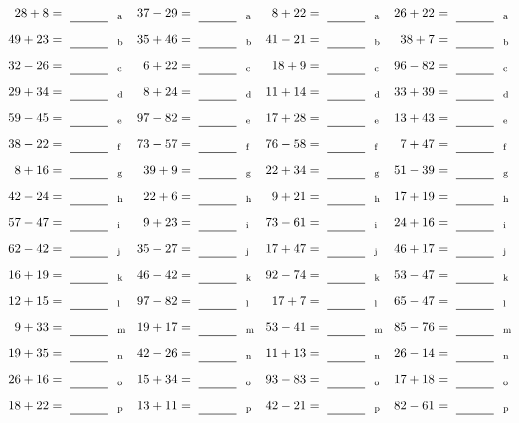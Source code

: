 \documentclass
[
  draft    = true,
  fontsize = 11pt,
  parskip  = half-
]
{scrartcl}
\begin{document}
\clearpage
\begin{align*}
    \pline{28+8}&=\rline{a}
  & \pline{37-29}&=\rline{a}
  & \pline{8+22}&=\rline{a}
  & \pline{26+22}&=\rline{a} \\[1ex]
    \pline{49+23}&=\rline{b}
  & \pline{35+46}&=\rline{b}
  & \pline{41-21}&=\rline{b}
  & \pline{38+7}&=\rline{b} \\[1ex]
    \pline{32-26}&=\rline{c}
  & \pline{6+22}&=\rline{c}
  & \pline{18+9}&=\rline{c}
  & \pline{96-82}&=\rline{c} \\[1ex]
    \pline{29+34}&=\rline{d}
  & \pline{8+24}&=\rline{d}
  & \pline{11+14}&=\rline{d}
  & \pline{33+39}&=\rline{d} \\[1ex]
    \pline{59-45}&=\rline{e}
  & \pline{97-82}&=\rline{e}
  & \pline{17+28}&=\rline{e}
  & \pline{13+43}&=\rline{e} \\[1ex]
    \pline{38-22}&=\rline{f}
  & \pline{73-57}&=\rline{f}
  & \pline{76-58}&=\rline{f}
  & \pline{7+47}&=\rline{f} \\[1ex]
    \pline{8+16}&=\rline{g}
  & \pline{39+9}&=\rline{g}
  & \pline{22+34}&=\rline{g}
  & \pline{51-39}&=\rline{g} \\[1ex]
    \pline{42-24}&=\rline{h}
  & \pline{22+6}&=\rline{h}
  & \pline{9+21}&=\rline{h}
  & \pline{17+19}&=\rline{h} \\[1ex]
    \pline{57-47}&=\rline{i}
  & \pline{9+23}&=\rline{i}
  & \pline{73-61}&=\rline{i}
  & \pline{24+16}&=\rline{i} \\[1ex]
    \pline{62-42}&=\rline{j}
  & \pline{35-27}&=\rline{j}
  & \pline{17+47}&=\rline{j}
  & \pline{46+17}&=\rline{j} \\[1ex]
    \pline{16+19}&=\rline{k}
  & \pline{46-42}&=\rline{k}
  & \pline{92-74}&=\rline{k}
  & \pline{53-47}&=\rline{k} \\[1ex]
    \pline{12+15}&=\rline{l}
  & \pline{97-82}&=\rline{l}
  & \pline{17+7}&=\rline{l}
  & \pline{65-47}&=\rline{l} \\[1ex]
    \pline{9+33}&=\rline{m}
  & \pline{19+17}&=\rline{m}
  & \pline{53-41}&=\rline{m}
  & \pline{85-76}&=\rline{m} \\[1ex]
    \pline{19+35}&=\rline{n}
  & \pline{42-26}&=\rline{n}
  & \pline{11+13}&=\rline{n}
  & \pline{26-14}&=\rline{n} \\[1ex]
    \pline{26+16}&=\rline{o}
  & \pline{15+34}&=\rline{o}
  & \pline{93-83}&=\rline{o}
  & \pline{17+18}&=\rline{o} \\[1ex]
    \pline{18+22}&=\rline{p}
  & \pline{13+11}&=\rline{p}
  & \pline{42-21}&=\rline{p}
  & \pline{82-61}&=\rline{p}
\end{align*}
\end{document}
